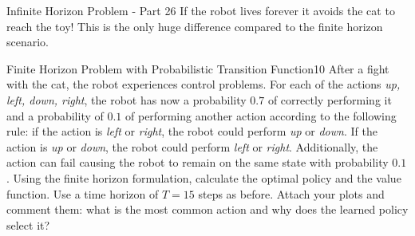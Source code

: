 \begin{questions}
\begin{question}{Infinite Horizon Problem - Part 2}{6}
If the robot lives forever it avoids the cat to reach the toy! This is the only huge difference compared to the finite horizon scenario.

\end{question}



\begin{question}{Finite Horizon Problem with Probabilistic Transition Function}{10}
After a fight with the cat, the robot experiences control problems. 
For each of the actions \textit{up, left, down, right}, the robot has now a probability $0.7$ of correctly performing it and a probability of $0.1$ of performing another action according to the following rule: if the action is \textit{left} or \textit{right}, the robot could perform \textit{up} or \textit{down}. If the action is \textit{up} or \textit{down}, the robot could perform \textit{left} or \textit{right}.
Additionally, the action can fail causing the robot to remain on the same state with probability $0.1$.
Using the finite horizon formulation, calculate the optimal policy and the value function. Use a time horizon of $T=15$ steps as before. Attach your plots and comment them: what is the most common action and why does the learned policy select it?


\end{question}
\end{questions}
